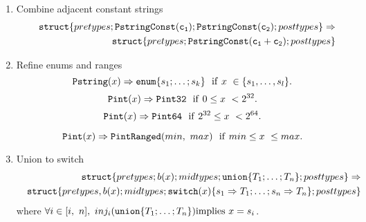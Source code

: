 \documentclass[fleqn]{article}
\newcommand{\struct}[1]{{\tt struct}\{#1\}}
\newcommand{\union}[1]{{\tt union}\{#1\}}
\newcommand{\enum}[1]{{\tt enum}\{#1\}}
\newcommand{\switch}[2]{{\tt switch}(#1)\{#2\}}
\newcommand{\goto}{\Rightarrow}
\begin{document}
\begin{enumerate}
\item Combine adjacent constant strings
\begin{eqnarray*}
&& \struct{pretypes; {\tt PstringConst (c_1)}; {\tt PstringConst(c_2)}; posttypes} \goto \\
&& \struct{pretypes; {\tt PstringConst (c_1 + c_2)}; posttypes} 
\end{eqnarray*}

\item Refine enums and ranges
\[
{\tt Pstring}(x) \goto \enum{s_1; \ldots; s_k} ~~
{\rm if}~ x~ \in \{s_1, \ldots, s_l\}.
\]
\[
{\tt Pint}(x) \goto {\tt Pint32} ~~
{\rm if}~ 0 \le x~ < 2^{32}.
\]
\[
{\tt Pint}(x) \goto {\tt Pint64} ~~
{\rm if}~ 2^{32} \le x~ < 2^{64}.
\]

\[
{\tt Pint}(x) \goto {\tt PintRanged}(min,~ max) ~~
{\rm if}~ min \le x~ \le max.
\]
\item Union to switch
\begin{eqnarray*}
&&\struct{pretypes; b(x); midtypes; \union{T_1; \ldots; T_n}; posttypes} \goto \\
&&\struct{pretypes, b(x); midtypes; \switch{x}{s_1 \goto T_1; \ldots; s_n \goto T_n}; posttypes}
\end{eqnarray*}
\noindent where $\forall i \in [i,~ n],~ inj_i(\union{T_1; \ldots; T_n}) {\rm implies}~ x = s_i$.

\end{enumerate}
\end{document}
